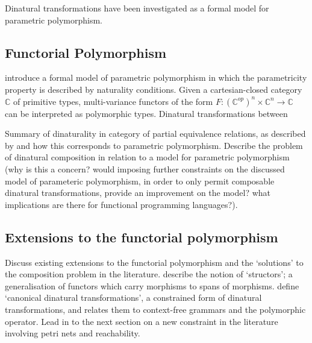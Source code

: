 \documentclass[../../Dissertation.tex]{subfiles}
\begin{document}
Dinatural transformations have been investigated as a formal model for parametric polymorphism.

\subsection{Functorial Polymorphism}
 introduce a formal model of parametric polymorphism in which the parametricity property is described by naturality conditions. Given a cartesian-closed category $\mathbb{C}$ of primitive types, multi-variance functors of the form $F : (\mathbb{C}^{op})^n \times \mathbb{C}^n \rightarrow \mathbb{C}$ can be interpreted as polymorphic types. Dinatural transformations between

Summary of dinaturality in category of partial equivalence relations, as described by  and how this corresponds to parametric polymorphism.
\newline\newline
Describe the problem of dinatural composition in relation to a model for parametric polymorphism (why is this a concern? would imposing further constraints on the discussed model of parameteric polymorphism, in order to only permit composable dinatural transformations, provide an improvement on the model? what implications are there for functional programming languages?).

\subsection{Extensions to the functorial polymorphism}
Discuss existing extensions to the functorial polymorphism and the `solutions' to the composition problem in the literature.
\newline\newline
{} describe the notion of `structors'; a generalisation of functors which carry morphisms to spans of morphisms.
\newline\newline
{} define `canonical dinatural transformations', a constrained form of dinatural transformations, and relates them to context-free grammars and the polymorphic operator.
\newline\newline
Lead in to the next section on a new constraint in the literature involving petri nets and reachability.
\end{document}
